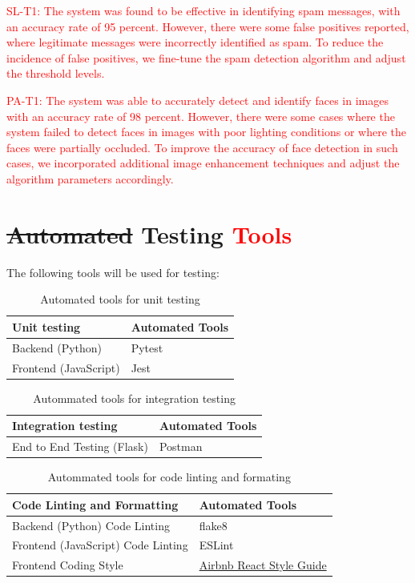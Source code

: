 \documentclass[12pt, oneside, openany, titlepage]{article}
\begin{document}
\textcolor{red}{SL-T1: The system was found to be effective in identifying spam messages, with an accuracy rate of 95 percent.
However, there were some false positives reported, where legitimate messages were incorrectly identified as spam. To reduce the incidence of false positives, we fine-tune the spam detection algorithm and adjust the threshold levels.}

\textcolor{red}{PA-T1: The system was able to accurately detect and identify faces in images with an accuracy rate of 98 percent. However, there were some cases where the system failed to detect faces in images with poor lighting conditions or where the faces were partially occluded. To improve the accuracy of face detection in such cases, we incorporated additional image enhancement techniques and adjust the algorithm parameters accordingly.}



\section{\sout{Automated} Testing \textcolor{red}{Tools}}
The following tools will be used for testing:

\begin{table}[ht!]
    \centering
    \begin{tabular}{p{}|p{}}
    \hline
        \textbf{Unit testing} & \textbf{Automated Tools} \\ \hline
        Backend (Python) & Pytest \\ \hline
        Frontend (JavaScript) & Jest \\ \hline
    \end{tabular}
    \caption{Automated tools for unit testing}
\end{table}

\begin{table}[!h]
    \centering
    \begin{tabular}{p{}|p{}}
    \hline
        \textbf{Integration testing} & \textbf{Automated Tools} \\ \hline
        End to End Testing (Flask) & Postman \\ \hline
    \end{tabular}
    \caption{Autommated tools for integration testing}
\end{table}

\begin{table}[!h]
    \centering
    \begin{tabular}{p{}|p{}}
    \hline
        \textbf{Code Linting and Formatting} & \textbf{Automated Tools} \\ \hline
        Backend (Python) Code Linting & flake8 \\ \hline
        Frontend (JavaScript) Code Linting & ESLint \\ \hline
        Frontend Coding Style & \href{https://airbnb.io/javascript/react/}{Airbnb React Style Guide} \\ \hline
    \end{tabular}
    \caption{Autommated tools for code linting and formating}
\end{table}
\end{document}

